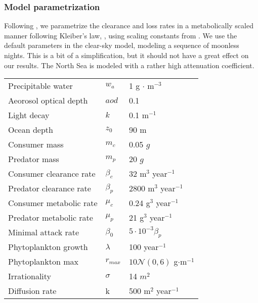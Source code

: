 \subsubsection*{Model parametrization}
Following \citep{yodzis1992body}, we parametrize the clearance and loss rates in a metabolically scaled manner following Kleiber's law, \citep{yodzis1992body}, using scaling constants from \citep{kha_2019}. We use the default parameters in the clear-sky model, modeling a sequence of moonless nights. This is a bit of a simplification, but it should not have a great effect on our results. The North Sea is modeled with a rather high attenuation coefficient.


\begin{tabular}{l | l | l}
  Precipitable water & $w_a$ & 1 g $\cdot$ m$^{-3}$\\
  Aeorosol optical depth & $aod$ & 0.1 \\
  Light decay & $k$ & 0.1 m$^{-1}$\\
  Ocean depth & $z_0$ & 90 m \\
  Consumer mass & $m_c$ & 0.05 $g$ \\
  Predator mass & $m_p$ & 20 $g$ \\
  Consumer clearance rate & $\beta_c$ & 32 m$^{3}$ year$^{-1}$ \\
  Predator clearance rate & $\beta_p$ & 2800 m$^3$ year$^{-1}$ \\
  Consumer metabolic rate & $\mu_c$ & 0.24 g$^{3}$ year$^{-1}$ \\
  Predator metabolic rate & $\mu_p$ & 21 g$^3$ year$^{-1}$ \\
  Minimal attack rate & $\beta_0$ & $5 \cdot 10^{-3} \beta_p$ \\
  Phytoplankton growth & $\lambda$ & 100 year$^{-1}$ \\
  Phytoplankton max & $r_{max}$ & $10\mathcal{N}(0,6)$ g$\cdot$m$^{-1}$ \\
  Irrationality & $\sigma$ & 14 $m^2$ \\
  Diffusion rate & k & 500 m$^{2}$ year$^{-1}$
\end{tabular}

